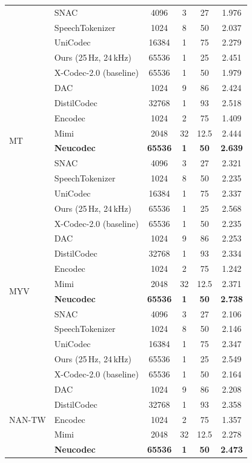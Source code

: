 \documentclass[preprint]{article}
\begin{document}
\begin{longtable}{llcccc}
  & SNAC & 4096 & 3 & 27 & 1.976 \\
  & SpeechTokenizer & 1024 & 8 & 50 & 2.037 \\
  & UniCodec & 16384 & 1 & 75 & 2.279 \\
  & Ours (25\,Hz, 24\,kHz) & 65536 & 1 & 25 & 2.451 \\
  & X-Codec-2.0 (baseline) & 65536 & 1 & 50 & 1.979 \\
\midrule
\multirow{8}{*}{MT}
  & DAC & 1024 & 9 & 86 & 2.424 \\
  & DistilCodec & 32768 & 1 & 93 & 2.518 \\
  & Encodec & 1024 & 2 & 75 & 1.409 \\
  & Mimi & 2048 & 32 & 12.5 & 2.444 \\
  & \textbf{Neucodec} & \textbf{65536} & \textbf{1} & \textbf{50} & \textbf{2.639} \\
  & SNAC & 4096 & 3 & 27 & 2.321 \\
  & SpeechTokenizer & 1024 & 8 & 50 & 2.235 \\
  & UniCodec & 16384 & 1 & 75 & 2.337 \\
  & Ours (25\,Hz, 24\,kHz) & 65536 & 1 & 25 & 2.568 \\
  & X-Codec-2.0 (baseline) & 65536 & 1 & 50 & 2.235 \\
\midrule
\multirow{8}{*}{MYV}
  & DAC & 1024 & 9 & 86 & 2.253 \\
  & DistilCodec & 32768 & 1 & 93 & 2.334 \\
  & Encodec & 1024 & 2 & 75 & 1.242 \\
  & Mimi & 2048 & 32 & 12.5 & 2.371 \\
  & \textbf{Neucodec} & \textbf{65536} & \textbf{1} & \textbf{50} & \textbf{2.738} \\
  & SNAC & 4096 & 3 & 27 & 2.106 \\
  & SpeechTokenizer & 1024 & 8 & 50 & 2.146 \\
  & UniCodec & 16384 & 1 & 75 & 2.347 \\
  & Ours (25\,Hz, 24\,kHz) & 65536 & 1 & 25 & 2.549 \\
  & X-Codec-2.0 (baseline) & 65536 & 1 & 50 & 2.164 \\
\midrule
\multirow{8}{*}{NAN-TW}
  & DAC & 1024 & 9 & 86 & 2.208 \\
  & DistilCodec & 32768 & 1 & 93 & 2.358 \\
  & Encodec & 1024 & 2 & 75 & 1.357 \\
  & Mimi & 2048 & 32 & 12.5 & 2.278 \\
  & \textbf{Neucodec} & \textbf{65536} & \textbf{1} & \textbf{50} & \textbf{2.473} \\

\end{longtable}
\end{document}
